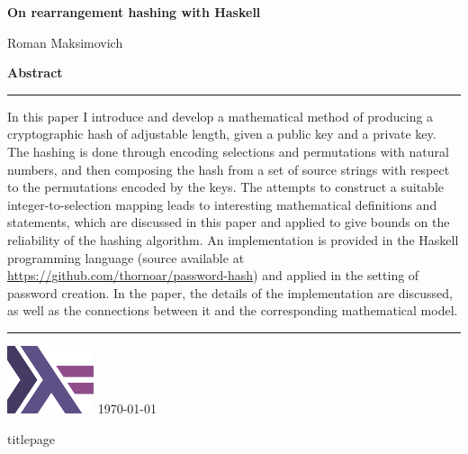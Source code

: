 \documentclass[12pt, a4paper]{article}
\begin{document}
\thispagestyle{empty}
\vspace*{.6in}
{ \Huge\bfseries On rearrangement hashing with Haskell }\par
\vspace*{.1in}
{ \Large Roman Maksimovich }
\par
\vspace*{2in}
{ \Large\bfseries Abstract }\par
\vspace*{.1in}
\hrule
\vspace*{.1in}
\centering
\begin{minipage}{0.9\textwidth}
In this paper I introduce and develop a mathematical method of producing a cryptographic hash of adjustable length, given a public key and a private key. The hashing is done through encoding selections and permutations with natural numbers, and then composing the hash from a set of source strings with respect to the permutations encoded by the keys. The attempts to construct a suitable integer-to-selection mapping leads to interesting mathematical definitions and statements, which are discussed in this paper and applied to give bounds on the reliability of the hashing algorithm. An implementation is provided in the Haskell programming language (source available at \url{https://github.com/thornoar/password-hash}) and applied in the setting of password creation. In the paper, the details of the implementation are discussed, as well as the connections between it and the corresponding mathematical model.
\end{minipage}
\vspace*{.1in}
\hrule
\vspace*{.2in}
\includegraphics[width = 1in]{./figures/haskell.png}
\vfill
\today

\newpage
\tableofcontents
\newpage


titlepage
\end{document}
